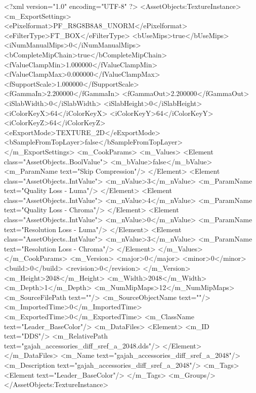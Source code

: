 <?xml version="1.0" encoding="UTF-8" ?>
<AssetObjects:TextureInstance>
<m_ExportSettings>
<ePixelformat>PF_R8G8B8A8_UNORM</ePixelformat>
<eFilterType>FT_BOX</eFilterType>
<bUseMips>true</bUseMips>
<iNumManualMips>0</iNumManualMips>
<bCompleteMipChain>true</bCompleteMipChain>
<fValueClampMin>1.000000</fValueClampMin>
<fValueClampMax>0.000000</fValueClampMax>
<fSupportScale>1.000000</fSupportScale>
<fGammaIn>2.200000</fGammaIn>
<fGammaOut>2.200000</fGammaOut>
<iSlabWidth>0</iSlabWidth>
<iSlabHeight>0</iSlabHeight>
<iColorKeyX>64</iColorKeyX>
<iColorKeyY>64</iColorKeyY>
<iColorKeyZ>64</iColorKeyZ>
<eExportMode>TEXTURE_2D</eExportMode>
<bSampleFromTopLayer>false</bSampleFromTopLayer>
</m_ExportSettings>
<m_CookParams>
<m_Values>
<Element class="AssetObjects..BoolValue">
<m_bValue>false</m_bValue>
<m_ParamName text="Skip Compression"/>
</Element>
<Element class="AssetObjects..IntValue">
<m_nValue>3</m_nValue>
<m_ParamName text="Quality Loss - Luma"/>
</Element>
<Element class="AssetObjects..IntValue">
<m_nValue>4</m_nValue>
<m_ParamName text="Quality Loss - Chroma"/>
</Element>
<Element class="AssetObjects..IntValue">
<m_nValue>0</m_nValue>
<m_ParamName text="Resolution Loss - Luma"/>
</Element>
<Element class="AssetObjects..IntValue">
<m_nValue>3</m_nValue>
<m_ParamName text="Resolution Loss - Chroma"/>
</Element>
</m_Values>
</m_CookParams>
<m_Version>
<major>0</major>
<minor>0</minor>
<build>0</build>
<revision>0</revision>
</m_Version>
<m_Height>2048</m_Height>
<m_Width>2048</m_Width>
<m_Depth>1</m_Depth>
<m_NumMipMaps>12</m_NumMipMaps>
<m_SourceFilePath text=""/>
<m_SourceObjectName text=""/>
<m_ImportedTime>0</m_ImportedTime>
<m_ExportedTime>0</m_ExportedTime>
<m_ClassName text="Leader_BaseColor"/>
<m_DataFiles>
<Element>
<m_ID text="DDS"/>
<m_RelativePath text="gajah_accessories_diff_sref_a_2048.dds"/>
</Element>
</m_DataFiles>
<m_Name text="gajah_accessories_diff_sref_a_2048"/>
<m_Description text="gajah_accessories_diff_sref_a_2048"/>
<m_Tags>
<Element text="Leader_BaseColor"/>
</m_Tags>
<m_Groups/>
</AssetObjects:TextureInstance>
